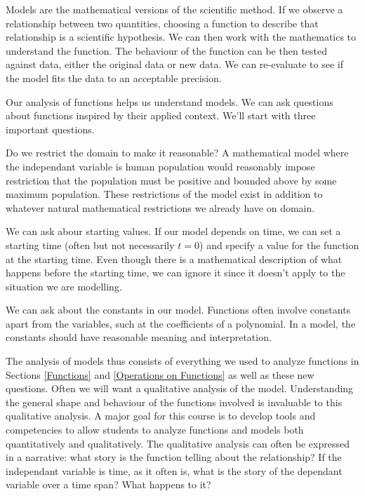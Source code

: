 \documentclass[fleqn]{report}
\begin{document}
Models are the mathematical versions of the scientific method.
If we observe a relationship between two quantities, choosing
a function to describe that relationship is a scientific
hypothesis. We can then work with the mathematics to
understand the function. The behaviour of the function can be
then tested against data, either the original data or new
data. We can re-evaluate to see if the model fits the data to
an acceptable precision.

Our analysis of functions helps us understand models. 
We can ask questions about functions inspired by
their applied context. We'll  start with three important
questions.

\begin{smallitemize}
\item Do we restrict the domain to make it reasonable? A
mathematical model where the independant variable is human
population would reasonably impose restriction that the
population must be positive and bounded above by some maximum
population. These restrictions of the model exist in addition
to whatever natural mathematical restrictions we already have
on domain.
\item We can ask abour starting values. If our model depends
on time, we can set a starting time (often but not necessarily
$t=0$) and specify a value for the function at the starting
time. Even though there is a mathematical description of what
happens before the starting time, we can ignore it since it
doesn't apply to the situation we are modelling.
\item We can ask about the constants in our model. Functions
often involve constants apart from the variables, such at the
coefficients of a polynomial. In a model, the constants should
have reasonable meaning and interpretation. 
\end{smallitemize}

The analysis of models thus consists of everything we used to
analyze functions in Sections \ref{Functions} and
\ref{Operations on Functions} as well as these new
questions. Often we will want a qualitative analysis of the
model. Understanding the general shape and behaviour of the
functions involved is invaluable to this qualitative analysis.
A major goal for this course is to develop tools and
competencies to allow students to analyze functions and
models both quantitatively and qualitatively. The
qualitative analysis can often be expressed in a narrative:
what story is the function telling about the relationship? If
the independant variable is time, as it often is, what is the
story of the dependant variable over a time span? What
happens to it? 
\end{document}

